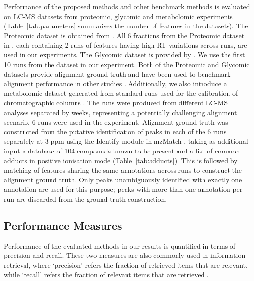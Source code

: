 Performance of the proposed methods and other benchmark methods is evaluated on LC-MS datasets from proteomic, glycomic and metabolomic experiments (Table~\ref{tab:parameters} summarises the number of features in the datasets). The Proteomic dataset is obtained from \cite{Lange2008}. All 6 fractions from the Proteomic dataset in \cite{Lange2008}, each containing 2 runs of features having high \ac{RT} variations across runs, are used in our experiments. The Glycomic dataset is provided by \cite{Tsai2013a}. We use the first 10 runs from the dataset in our experiment. Both of the Proteomic and Glycomic datasets provide alignment ground truth and have been used to benchmark alignment performance in other studies \cite{Lange2008, Pluskal2010, Ballardini2011, Voss2011a, Tsai2013a}. Additionally, we also introduce a metabolomic dataset generated from standard runs used for the calibration of chromatographic columns \cite{Creek2011}. The runs were produced from different LC-MS analyses separated by weeks, representing a potentially challenging alignment scenario. 6 runs were used in the experiment. Alignment ground truth was constructed from the putative identification of peaks in each of the 6 runs separately at 3 ppm using the Identify module in mzMatch \cite{Scheltema2011}, taking as additional input a database of 104 compounds known to be present and a list of common adducts in positive ionisation mode (Table~\ref{tab:adducts}). This is followed by matching of features sharing the same annotations across runs to construct the alignment ground truth. Only peaks unambiguously identified with exactly one annotation are used for this purpose; peaks with more than one annotation per run are discarded from the ground truth construction. 

\subsection{Performance Measures}
\label{sub:Performance-Measures}

Performance of the evaluated methods in our results is quantified in terms of precision and recall. These two measures are also commonly used in information retrieval, where `precision' refers the fraction of retrieved items that are relevant, while `recall' refers the fraction of relevant items that are retrieved \cite{Manning2008}. 

